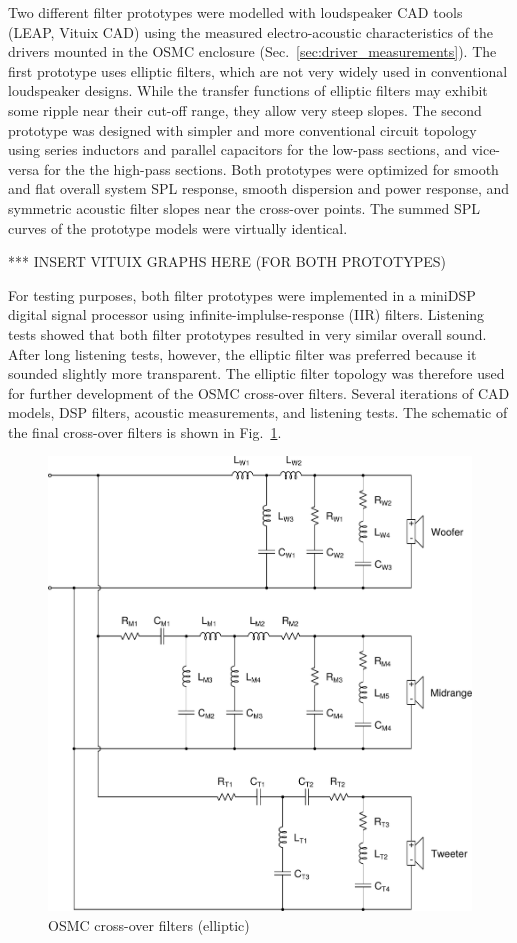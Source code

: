 \documentclass[12pt,a4paper]{article}
\providecommand{\figr}[1]{Fig.~\ref{fig:#1}}
\providecommand{\figlabel}[1]{\label{fig:#1}}
\providecommand{\sectn}[1]{Sec.~\ref{sec:#1}}
\begin{document}
Two different filter prototypes\cite{osmc_p685} were modelled with loudspeaker CAD tools (LEAP, Vituix CAD) using the measured electro-acoustic characteristics of the drivers mounted in the OSMC enclosure (\sectn{driver_measurements}). The first prototype uses elliptic filters, which are not very widely used in conventional loudspeaker designs. While the transfer functions of elliptic filters may exhibit some ripple near their cut-off range, they allow very steep slopes. The second prototype was designed with simpler and more conventional circuit topology using series inductors and parallel capacitors for the low-pass sections, and vice-versa for the the high-pass sections. Both prototypes were optimized for smooth and flat overall system SPL response, smooth dispersion and power response, and symmetric acoustic filter slopes near the cross-over points. The summed SPL curves of the prototype models were virtually identical.

*** INSERT VITUIX GRAPHS HERE (FOR BOTH PROTOTYPES)

For testing purposes, both filter prototypes were implemented in a miniDSP digital signal processor using infinite-implulse-response (IIR) filters. Listening tests showed that both filter prototypes resulted in very similar overall sound. After long listening tests, however, the elliptic filter was preferred because it sounded slightly more transparent\cite{osmc_p708}. The elliptic filter topology was therefore used for further development of the OSMC cross-over filters. Several iterations of CAD models, DSP filters, acoustic measurements, and listening tests. The schematic of the final cross-over filters is shown in \figr{OSMC_EL_xover_schem}.

\begin{figure}[p]
	\centering
	\includegraphics[width=\textwidth]{EL34_20190303.pdf}
	\caption{OSMC cross-over filters (elliptic)}
	\figlabel{OSMC_EL_xover_schem}
\end{figure}
\end{document}
